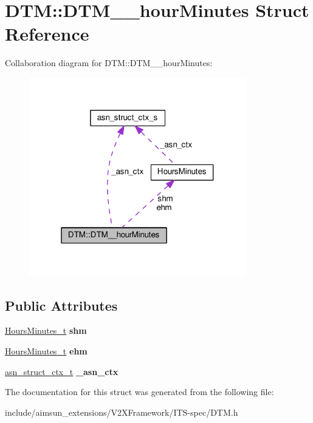 \hypertarget{structDTM_1_1DTM____hourMinutes}{}\section{D\+TM\+:\+:D\+T\+M\+\_\+\+\_\+hour\+Minutes Struct Reference}
\label{structDTM_1_1DTM____hourMinutes}


Collaboration diagram for D\+TM\+:\+:D\+T\+M\+\_\+\+\_\+hour\+Minutes\+:\nopagebreak
\begin{figure}[H]
\begin{center}
\leavevmode
\includegraphics[width=268pt]{structDTM_1_1DTM____hourMinutes__coll__graph}
\end{center}
\end{figure}
\subsection*{Public Attributes}
\begin{DoxyCompactItemize}
\item 
\hyperlink{structHoursMinutes}{Hours\+Minutes\+\_\+t} {\bfseries shm}\hypertarget{structDTM_1_1DTM____hourMinutes_ad48216f1e8cd26e6c5a87ea55583cd45}{}\label{structDTM_1_1DTM____hourMinutes_ad48216f1e8cd26e6c5a87ea55583cd45}

\item 
\hyperlink{structHoursMinutes}{Hours\+Minutes\+\_\+t} {\bfseries ehm}\hypertarget{structDTM_1_1DTM____hourMinutes_a2ea76550990d3e6d71b32435566dd136}{}\label{structDTM_1_1DTM____hourMinutes_a2ea76550990d3e6d71b32435566dd136}

\item 
\hyperlink{structasn__struct__ctx__s}{asn\+\_\+struct\+\_\+ctx\+\_\+t} {\bfseries \+\_\+asn\+\_\+ctx}\hypertarget{structDTM_1_1DTM____hourMinutes_ad2fe96d32ba05df9cf440c9f9d0c5699}{}\label{structDTM_1_1DTM____hourMinutes_ad2fe96d32ba05df9cf440c9f9d0c5699}

\end{DoxyCompactItemize}


The documentation for this struct was generated from the following file\+:\begin{DoxyCompactItemize}
\item 
include/aimsun\+\_\+extensions/\+V2\+X\+Framework/\+I\+T\+S-\/spec/D\+T\+M.\+h\end{DoxyCompactItemize}
